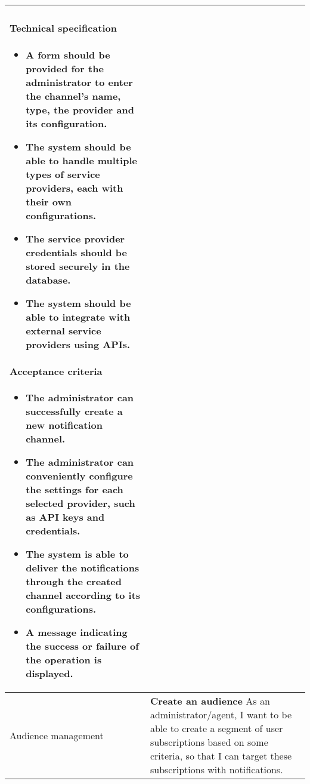 \begin{longtable}{ | m{} | m{} | }
    \paragraph*{Technical specification} \mbox{} \newline
    \begin{itemize}
        \item A form should be provided for the administrator to enter the channel's name, type, the provider and its configuration.
        \item The system should be able to handle multiple types of service providers, each with their own configurations.
        \item The service provider credentials should be stored securely in the database.
        \item The system should be able to integrate with external service providers using APIs.
    \end{itemize}
    \paragraph*{Acceptance criteria} \mbox{} \newline
    \begin{itemize}
        \item The administrator can successfully create a new notification channel.
        \item The administrator can conveniently configure the settings for each selected provider, such as API keys and credentials.
        \item The system is able to deliver the notifications through the created channel according to its configurations.
        \item A message indicating the success or failure of the operation is displayed.
    \end{itemize}                                                                                                                                          \\
    \hline
    Audience \newline management                       & \textbf{Create an audience} \newline As an administrator/agent, I want to be able to create a segment of user subscriptions based on some criteria, so that I can target these subscriptions with notifications.

\end{longtable}
